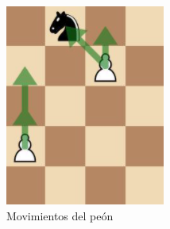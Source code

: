 \documentclass[conference]{IEEEtran}
\begin{document}
    \begin{figure}[h!]
    \centering
    \begin{subfigure}[b]{0.45\linewidth}
    \includegraphics[width=\linewidth]{images/Capturep01.PNG}
    \caption{Movimientos del peón}
    \label{fig:peonM}
    \end{subfigure}
    \begin{subfigure}[b]{0.455\linewidth}

\end{subfigure}
\end{figure}
\end{document}
